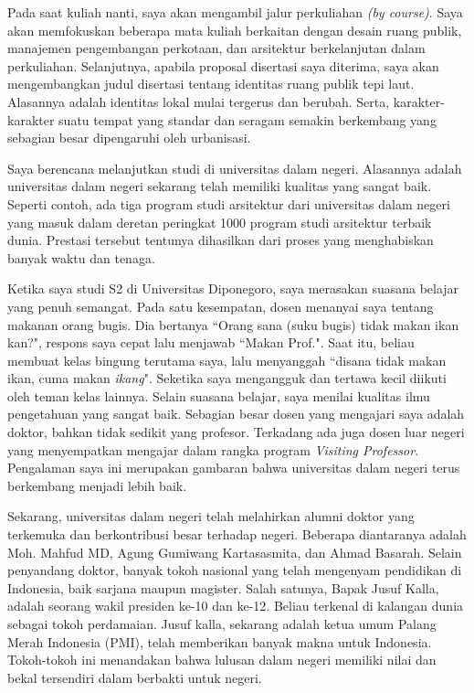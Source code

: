 \documentclass[../main.tex]{subfiles}
\begin{document}
Pada saat kuliah nanti, saya akan mengambil jalur perkuliahan \textit{(by course)}.
Saya akan memfokuskan beberapa mata kuliah berkaitan dengan desain ruang publik, manajemen pengembangan perkotaan, dan arsitektur berkelanjutan dalam perkuliahan.
Selanjutnya, apabila proposal disertasi saya diterima, saya akan mengembangkan judul disertasi tentang identitas ruang publik tepi laut.
Alasannya adalah identitas lokal mulai tergerus dan berubah.
Serta, karakter-karakter suatu tempat yang standar dan seragam semakin berkembang yang sebagian besar dipengaruhi oleh urbanisasi.


Saya berencana melanjutkan studi di universitas dalam negeri. Alasannya adalah universitas dalam negeri sekarang telah memiliki kualitas yang sangat baik. Seperti contoh, ada tiga program studi arsitektur dari universitas dalam negeri yang masuk dalam deretan peringkat 1000 program studi arsitektur terbaik dunia. Prestasi tersebut tentunya dihasilkan dari proses yang menghabiskan banyak waktu dan tenaga.

Ketika saya studi S2 di Universitas Diponegoro, saya merasakan suasana belajar yang penuh semangat. Pada satu kesempatan, dosen menanyai saya tentang makanan orang bugis. Dia bertanya ``Orang sana (suku bugis) tidak makan ikan kan?", respons saya cepat lalu menjawab ``Makan Prof.". Saat itu, beliau membuat kelas bingung terutama saya, lalu menyanggah ``disana tidak makan ikan, cuma makan \textit{ikang}".
Seketika saya mengangguk dan tertawa kecil diikuti oleh teman kelas lainnya. Selain suasana belajar, saya menilai kualitas ilmu pengetahuan yang sangat baik.
Sebagian besar dosen yang mengajari saya adalah doktor, bahkan tidak sedikit yang profesor. Terkadang ada juga dosen luar negeri yang menyempatkan mengajar dalam rangka program \textit{Visiting Professor}. Pengalaman saya ini merupakan gambaran bahwa universitas dalam negeri terus berkembang menjadi lebih baik.

Sekarang, universitas dalam negeri telah melahirkan alumni doktor yang terkemuka dan berkontribusi besar terhadap negeri.
Beberapa diantaranya adalah Moh. Mahfud MD, Agung Gumiwang Kartasasmita, dan Ahmad Basarah. Selain penyandang doktor, banyak tokoh nasional yang telah mengenyam pendidikan di Indonesia, baik sarjana maupun magister. Salah satunya, Bapak Jusuf Kalla, adalah seorang wakil presiden ke-10 dan ke-12. Beliau terkenal di kalangan dunia sebagai tokoh perdamaian. Jusuf kalla, sekarang adalah ketua umum Palang Merah Indonesia (PMI), telah memberikan banyak makna untuk Indonesia.
Tokoh-tokoh ini menandakan bahwa lulusan dalam negeri memiliki nilai dan bekal tersendiri dalam berbakti untuk negeri.
\end{document}
